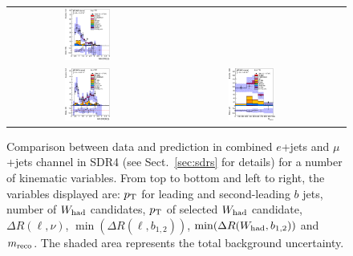 \begin{figure}[htbp]
\begin{center}
\begin{tabular}{ccc}
\includegraphics[width=0.30\textwidth]{appendices/figures/sdrs/VLQAna_WbX_MinDRlb_ELEMUONCR3_1W_NOMINAL.eps} \\
\includegraphics[width=0.30\textwidth]{appendices/figures/sdrs/VLQAna_WbX_MinDRWb_ELEMUONCR3_1W_NOMINAL.eps} &
\includegraphics[width=0.30\textwidth]{appendices/figures/sdrs/VLQAna_WbX_1W_MWb_4_ELEMUONCR3_1W_NOMINAL.eps} & \\
\end{tabular}\caption{\small {Comparison between data and prediction in combined $e$+jets and $\mu$+jets channel in SDR4 (see Sect.~\ref{sec:sdrs} for details) 
for a number of kinematic variables. From top to bottom and left to right, the variables displayed are: $\pt$ for leading and second-leading $b$ jets,
number of $W_{\rm had}$  candidates, $\pt$ of selected $W_{\rm had}$  candidate, $\Delta R(\ell,\nu)$, $\min(\Delta R(\ell, b_{1,2}))$, 
$\min(\Delta R(W_{\rm had}, b_{1,2}))$ and $m_{\rm reco}$.
The shaded area represents the total background uncertainty.}}
\label{fig:ELEMUONCR3_3}
\end{center}
\end{figure}                                                                             
